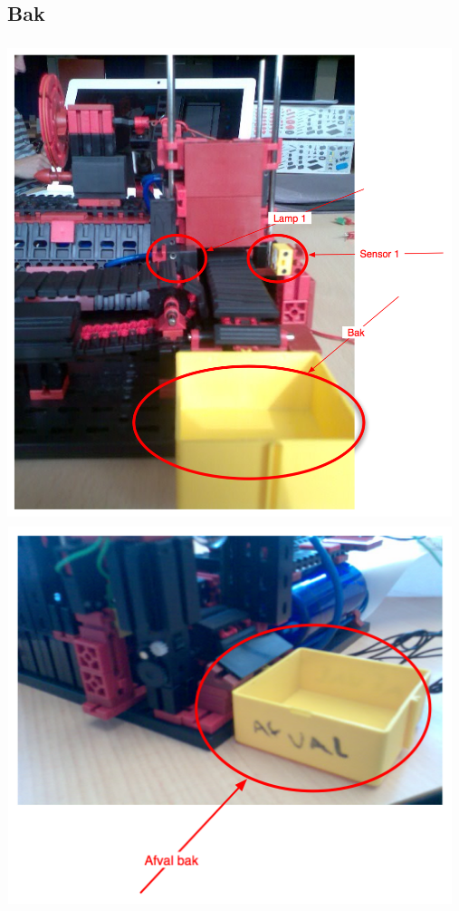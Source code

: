 \subsection{Bak}\label{sub:bak} %
\includegraphics[width=13cm, height=14cm]{lamp} \\
\includegraphics[width=13cm, height=11cm]{afval} \\

